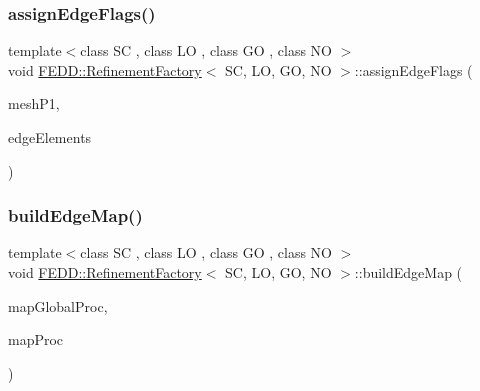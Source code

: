 \mbox{\label{classFEDD_1_1RefinementFactory_af7a24f2ea3ebe601eb6359b1b0bbc9a7}} 
\subsubsection{\texorpdfstring{assign\+Edge\+Flags()}{assignEdgeFlags()}}
{\footnotesize\ttfamily template$<$class SC , class LO , class GO , class NO $>$ \\
void \hyperlink{classFEDD_1_1RefinementFactory}{F\+E\+D\+D\+::\+Refinement\+Factory}$<$ SC, LO, GO, NO $>$\+::assign\+Edge\+Flags (\begin{DoxyParamCaption}\item[{\hyperlink{classFEDD_1_1RefinementFactory_aea0fab96821387bc772333299102b2c9}{Mesh\+Unstr\+Ref\+Ptr\+\_\+\+Type}}]{mesh\+P1,  }\item[{\hyperlink{classFEDD_1_1RefinementFactory_ae5285e990ec4632d6188a1280627ad13}{Edge\+Elements\+Ptr\+\_\+\+Type}}]{edge\+Elements }\end{DoxyParamCaption})}

\mbox{\label{classFEDD_1_1RefinementFactory_a4294d0901e6691203b9043bb2f9c6ac6}} 
\subsubsection{\texorpdfstring{build\+Edge\+Map()}{buildEdgeMap()}}
{\footnotesize\ttfamily template$<$class SC , class LO , class GO , class NO $>$ \\
void \hyperlink{classFEDD_1_1RefinementFactory}{F\+E\+D\+D\+::\+Refinement\+Factory}$<$ SC, LO, GO, NO $>$\+::build\+Edge\+Map (\begin{DoxyParamCaption}\item[{\hyperlink{classFEDD_1_1RefinementFactory_a8256ccdf1b2a5c977ddc011f4e8eb8d3}{Map\+Const\+Ptr\+\_\+\+Type}}]{map\+Global\+Proc,  }\item[{\hyperlink{classFEDD_1_1RefinementFactory_a8256ccdf1b2a5c977ddc011f4e8eb8d3}{Map\+Const\+Ptr\+\_\+\+Type}}]{map\+Proc }\end{DoxyParamCaption})}


